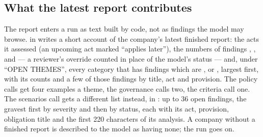 \subsection{What the latest report contributes}\label{sec:programme:report}

The report enters a run as text built by code, not as findings the model may browse.
 in  writes a short account of the company's
latest finished report: the acts it assessed (an upcoming act marked \enquote{applies
later}), the numbers of findings , ,  and
 --- a reviewer's override counted in place of the model's status --- and, under \enquote{OPEN THEMES}, every category that has findings which
are ,  or , largest first, with its counts and
a few of those findings by title, act and provision. The policy calls get four examples a
theme, the governance calls two, the criteria call one. The scenarios call gets a different
list instead,  in : up to 36 open findings,
the gravest first by severity and then by status, each with its act, provision, obligation
title and the first 220 characters of its analysis. A company without a finished report is
described to the model as having none; the run goes on.

